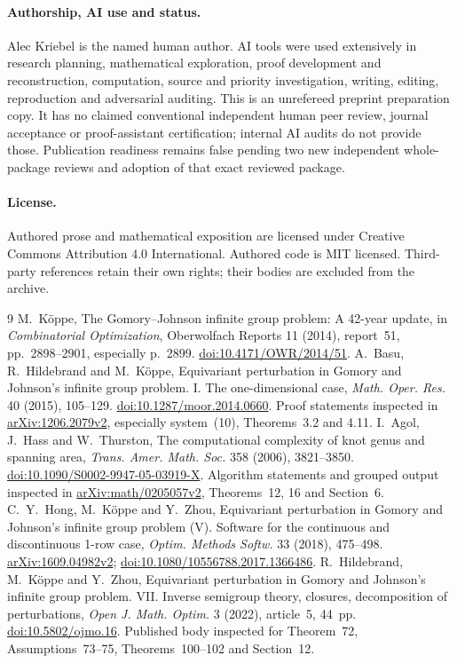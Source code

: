 \documentclass[11pt]{article}
\begin{document}
\paragraph{Authorship, AI use and status.}
Alec Kriebel is the named human author. AI tools were used extensively in research planning, mathematical exploration, proof development and reconstruction, computation, source and priority investigation, writing, editing, reproduction and adversarial auditing. This is an unrefereed preprint preparation copy. It has no claimed conventional independent human peer review, journal acceptance or proof-assistant certification; internal AI audits do not provide those. Publication readiness remains false pending two new independent whole-package reviews and adoption of that exact reviewed package.

\paragraph{License.}
Authored prose and mathematical exposition are licensed under Creative Commons Attribution 4.0 International. Authored code is MIT licensed. Third-party references retain their own rights; their bodies are excluded from the archive.

\begin{thebibliography}{9}
 M.~K\"oppe, The Gomory--Johnson infinite group problem: A 42-year update, in \emph{Combinatorial Optimization}, Oberwolfach Reports 11 (2014), report~51, pp.~2898--2901, especially p.~2899. \href{https://doi.org/10.4171/OWR/2014/51}{doi:10.4171/OWR/2014/51}.
 A.~Basu, R.~Hildebrand and M.~K\"oppe, Equivariant perturbation in Gomory and Johnson's infinite group problem. I. The one-dimensional case, \emph{Math. Oper. Res.} 40 (2015), 105--129. \href{https://doi.org/10.1287/moor.2014.0660}{doi:10.1287/moor.2014.0660}. Proof statements inspected in \href{https://arxiv.org/abs/1206.2079v2}{arXiv:1206.2079v2}, especially system~(10), Theorems~3.2 and 4.11.
 I.~Agol, J.~Hass and W.~Thurston, The computational complexity of knot genus and spanning area, \emph{Trans. Amer. Math. Soc.} 358 (2006), 3821--3850. \href{https://doi.org/10.1090/S0002-9947-05-03919-X}{doi:10.1090/S0002-9947-05-03919-X}. Algorithm statements and grouped output inspected in \href{https://arxiv.org/abs/math/0205057v2}{arXiv:math/0205057v2}, Theorems~12, 16 and Section~6.
 C.~Y.~Hong, M.~K\"oppe and Y.~Zhou, Equivariant perturbation in Gomory and Johnson's infinite group problem (V). Software for the continuous and discontinuous 1-row case, \emph{Optim. Methods Softw.} 33 (2018), 475--498. \href{https://arxiv.org/abs/1609.04982v2}{arXiv:1609.04982v2}; \href{https://doi.org/10.1080/10556788.2017.1366486}{doi:10.1080/10556788.2017.1366486}.
 R.~Hildebrand, M.~K\"oppe and Y.~Zhou, Equivariant perturbation in Gomory and Johnson's infinite group problem. VII. Inverse semigroup theory, closures, decomposition of perturbations, \emph{Open J. Math. Optim.} 3 (2022), article~5, 44~pp. \href{https://doi.org/10.5802/ojmo.16}{doi:10.5802/ojmo.16}. Published body inspected for Theorem~72, Assumptions~73--75, Theorems~100--102 and Section~12.
\end{thebibliography}
\end{document}
